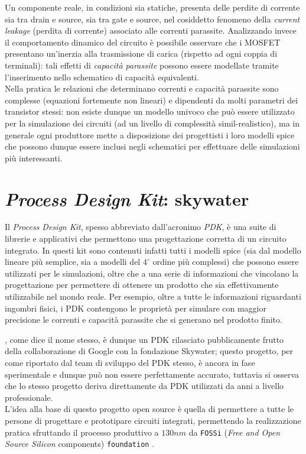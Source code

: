 	Un componente reale, in condizioni sia statiche, presenta delle perdite di corrente sia tra drain e source, sia tra gate e source, nel cosiddetto fenomeno della \textit{current leakage} (perdita di corrente) associato alle correnti parassite. Analizzando invece il comportamento dinamico del circuito è possibile osservare che i MOSFET presentano un'inerzia alla trasmissione di carica (rispetto ad ogni coppia di terminali): tali effetti di \textit{capacità parassite} possono essere modellate tramite l'inserimento nello schematico di capacità equivalenti. \\
	Nella pratica le relazioni che determinano correnti e capacità parassite sono complesse (equazioni fortemente non lineari) e dipendenti da molti parametri dei transistor stessi: non esiste dunque un modello univoco che può essere utilizzato per la simulazione dei circuiti (ad un livello di complessità simil-realistico), ma in generale ogni produttore mette a disposizione dei progettisti i loro modelli spice che possono dunque essere inclusi negli schematici per effettuare delle simulazioni più interessanti.
	
\section{\textit{Process Design Kit}: skywater}
	
	Il \textit{Process Design Kit}, spesso abbreviato dall'acronimo \textit{PDK}, è una suite di librerie e applicativi che permettono una progettazione corretta di un circuito integrato. In questi kit sono contenuti infatti tutti i modelli spice (sia dal modello lineare più semplice, sia a modelli del $4^\circ$ ordine più complessi) che possono essere utilizzati per le simulazioni, oltre che a una serie di informazioni che vincolano la progettazione per permettere di ottenere un prodotto che sia effettivamente utilizzabile nel mondo reale. Per esempio, oltre a tutte le informazioni riguardanti ingombri fisici, i PDK contengono le proprietà per simulare con maggior precisione le correnti e capacità parassite che si generano nel prodotto finito.
	
	\skywater, come dice il nome stesso, è dunque un PDK rilasciato pubblicamente frutto della collaborazione di Google con la fondazione Skywater; questo progetto, per come riportato dal team di sviluppo del PDK stesso, è ancora in fase sperimentale e dunque può non essere perfettamente accurato, tuttavia si osserva che lo stesso progetto deriva direttamente da PDK utilizzati da anni a livello professionale. \\
	L'idea alla base di questo progetto open source è quella di permettere a tutte le persone di progettare e prototipare circuiti integrati, permettendo la realizzazione pratica sfruttando il processo produttivo a $130 nm$ da \texttt{FOSSi} (\textit{Free and Open Source Silicon} components) \texttt{foundation} \cite{fossi}.
	
